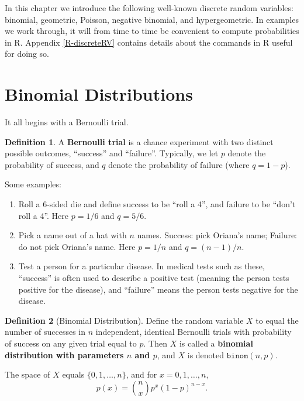 \documentclass[
]{book}
\providecommand{\tightlist}{%
  \setlength{\itemsep}{0pt}\setlength{\parskip}{0pt}}
\theoremstyle{definition}
\newtheorem{definition}{Definition}[chapter]
\theoremstyle{definition}
\theoremstyle{definition}
\theoremstyle{definition}
\theoremstyle{remark}
\begin{document}
In this chapter we introduce the following well-known discrete random variables:
binomial, geometric, Poisson, negative binomial, and hypergeometric.
In examples we work through, it will from time to time be convenient to compute probabilities in R. Appendix \ref{R-discreteRV} contains details about the commands in R useful for doing so.

\section{Binomial Distributions}\label{binomial}

It all begins with a Bernoulli trial.

\begin{definition}
\protect\hypertarget{def:bernoulli-trial}{}\label{def:bernoulli-trial}A \textbf{Bernoulli trial} is a chance experiment with two distinct possible outcomes, ``success'' and ``failure''. Typically, we let \(p\) denote the probability of success, and \(q\) denote the probability of failure (where \(q = 1 - p\)).
\end{definition}

Some examples:

\begin{enumerate}
\def\labelenumi{\arabic{enumi}.}
\tightlist
\item
  Roll a 6-sided die and define success to be ``roll a 4'', and failure to be ``don't roll a 4''. Here \(p = 1/6\) and \(q = 5/6\).
\item
  Pick a name out of a hat with \(n\) names. Success: pick Oriana's name; Failure: do not pick Oriana's name. Here \(p = 1/n\) and \(q = (n-1)/n\).
\item
  Test a person for a particular disease. In medical tests such as these, ``success'' is often used to describe a positive test (meaning the person tests positive for the disease), and ``failure'' means the person tests negative for the disease.
\end{enumerate}

\begin{definition}[Binomial Distribution]
\protect\hypertarget{def:binomial-distribution}{}\label{def:binomial-distribution}Define the random variable \(X\) to equal the number of successes in \(n\) independent, identical Bernoulli trials with probability of success on any given trial equal to \(p\). Then \(X\) is called a \textbf{binomial distribution with parameters \(n\) and \(p\)}, and \(X\) is denoted \(\texttt{binom}(n,p)\).

The space of \(X\) equals \(\{0,1,\ldots,n\}\), and for \(x = 0,1, \ldots, n\),
\[p(x) = \binom{n}{x}p^x(1-p)^{n-x}.\]
\end{definition}
\end{document}
